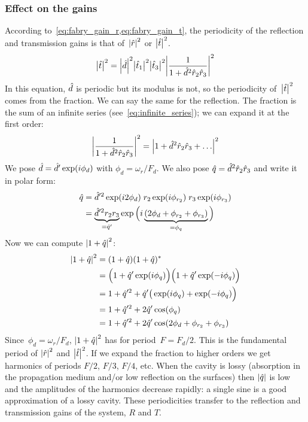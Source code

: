 
\subsubsection{Effect on the gains}
\label{sec:fabry_gain}

According to~\cref{eq:fabry_gain_r,eq:fabry_gain_t},
the periodicity of the reflection and transmission gains is that of~$\abs{\cp{r}}^2$ or $\abs{\cp{t}}^2$.
\begin{equation}
    \abs{\cp{t}}^2 = \abs{\cp{d}}^2 \abs{\cp{t}_1}^2 \abs{\cp{t}_3}^2
    \abs{
        \frac{1}{1 + \cp{d}^2 \cp{r}_2 \cp{r}_3}
    }^2
    \label{eq:fabry_gain_r2_r3}
\end{equation}
In this equation, $\hat{d}$ is periodic but its modulus is not,
so the periodicity of~$\abs{\cp{t}}^2$ comes from the fraction.
We can say the same for the reflection.
The fraction is the sum of an infinite series (see~\cref{eq:infinite_series}); we can expand it at the first order:
\begin{equation}
    \abs{
        \frac{1}{1 + \cp{d}^2 \cp{r}_2 \cp{r}_3}
    }^2
    =
    \abs{
        1 + \cp{d}^2 \cp{r}_2 \cp{r}_3 + \ldots
    }^2
\end{equation}
We pose
$\hat{d} = \hat{d}' \exp(i\phi_d)$ with $\phi_d = \omega_r/F_d$.
We also pose
$\hat{q} = \hat{d}^2 \hat{r}_2 \hat{r}_3$ and write it in polar form:
\begin{align}
    \hat{q}
    &=
    \hat{d}'^2 \exp(i2\phi_d)    \;
    r_2 \exp(i\phi_{r_2}) \;
    r_3 \exp(i\phi_{r_3})
    \\
    &=
    \underbrace{\hat{d}'^2 r_2 r_3}_{=\hat{q}'}
    \exp
    \Big(
        i
        \underbrace{(2 \phi_d + \phi_{r_2} + \phi_{r_3})}_{=\phi_q}
    \Big)
\end{align}
Now we can compute $\abs{1+\cp{q}}^2$:
\begin{align}
    \abs{1+\cp{q}}^2
    &=
    (1+\cp{q}) (1+\cp{q})^*
    \\
    &=
    \Big(1 + \cp{q}' \exp(i\phi_q)\Big)
    \Big(1 + \cp{q}' \exp(-i\phi_q)\Big)
    \\
    &=
    1 + \cp{q}'^2 + \cp{q}' \big( \exp(i\phi_q) + \exp(-i\phi_q) \Big)
    \\
    &=
    1 + \cp{q}'^2 + 2\cp{q}' \cos(\phi_q)
    \\
    &=
    1 + \cp{q}'^2 + 2\cp{q}' \cos(2 \phi_d + \phi_{r_2} + \phi_{r_3})
\end{align}
Since~$\phi_d = \omega_r/F_d$, $\abs{1+\cp{q}}^2$ has for period~$F=F_d/2$.
This is the fundamental period of $\abs{\cp{r}}^2$ and $\abs{\cp{t}}^2$.
If we expand the fraction to higher orders
we get harmonics of periods $F/2$, $F/3$, $F/4$, etc.
When the cavity is lossy (absorption in the propagation medium and/or low reflection on the surfaces) then $\abs{\cp{q}}$ is low and the amplitudes of the harmonics decrease rapidly: a single sine is a good approximation of a lossy cavity.
These periodicities transfer to the reflection and transmission gains of the system, $R$ and $T$.

